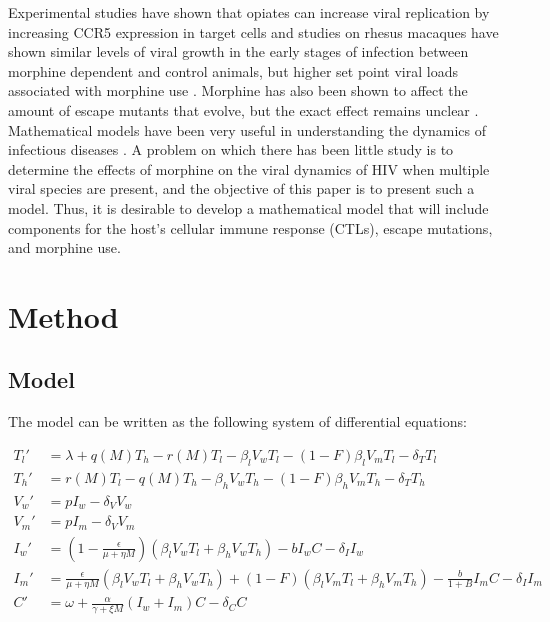 \documentclass[11pt, oneside]{article}    %
\begin{document}
	Experimental studies have shown that opiates can increase viral replication by increasing CCR5 expression in target cells \cite{Li} and studies on rhesus macaques have shown similar levels of viral growth in the early stages of infection between morphine dependent and control animals, but higher set point viral loads associated with morphine use \cite{Kumar}. Morphine has also been shown to affect the amount of escape mutants that evolve, but the exact effect remains unclear \cite{Noel1}. Mathematical models have been very useful in understanding the dynamics of infectious diseases \cite{Perelson, Chubb}. A problem on which there has been little study is to determine the effects of morphine on the viral dynamics of HIV when multiple viral species are present, and the objective of this paper is to present such a model. Thus, it is desirable to develop a mathematical model that will include components for the host’s cellular immune response (CTLs), escape mutations, and morphine use.

\section{Method}
\subsection{Model}

	The model can be written as the following system of differential equations:

\begin{align*}
T_l' & =  \lambda + q(M) T_h - r(M) T_l - \beta_l V_w T_l - (1-F) \beta_l V_m T_l - \delta_T T_l \\
T_h' & =  r(M) T_l - q(M) T_h - \beta_h V_w T_h - (1-F) \beta_h V_m T_h - \delta_T T_h\\
V_w' & =  p I_w - \delta_V V_w\\
V_m' & =  p I_m - \delta_V V_m\\
I_w' & =  (1-\frac{\epsilon}{\mu + \eta M})(\beta_l V_w T_l + \beta_h V_w T_h) - b I_w C - \delta_I I_w\\
I_m' & = \frac{\epsilon}{\mu + \eta M}(\beta_l V_w T_l + \beta_h V_w T_h) + (1-F) (\beta_l V_m T_l +\beta_h V_m T_h) -\frac{b} {1+B} I_m C -\delta_I I_m\\
C' & =  \omega + \frac{\alpha}{\gamma + \xi M}(I_w + I_m)C - \delta_C C\\
\end{align*}
\end{document}
